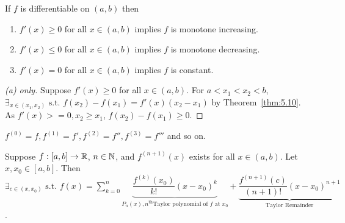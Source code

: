 \begin{thm}[11]
	If $f$ is differentiable on $(a,b)$ then
	\begin{enumerate}
		\item  $f'(x)\ge 0$ for all $x \in (a,b)$ implies $f$ is monotone increasing.
		\item  $f'(x)\le 0$ for all $x \in (a,b)$ implies $f$ is monotone decreasing.
		\item  $f'(x)= 0$ for all $x \in (a,b)$ implies $f$ is constant.
	\end{enumerate}
	\begin{proof}[(a) only]
		Suppose $f'(x)\ge 0$ for all $x \in (a,b)$.
		For $a<x_1<x_2<b$, $\exists_{x \in (x_1,x_2)} \text{ s.t. } f(x_2)-f(x_1)=f'(x)(x_2-x_1)$ by Theorem~\ref{thm:5.10}.
		As $f'(x)>=0, x_2\ge x_1$, $f(x_2)-f(x_1)\ge 0$.
	\end{proof}
\end{thm}

\begin{definition}
	$f^{(0)}=f, f^{(1)}=f', f^{(2)}=f'', f^{(3)}=f'''$ and so on.
\end{definition}

\begin{thm}
	Suppose $f:[a,b]\to \mathbb{R}$, $n \in \mathbb{N}$, and $f^{(n+1)}(x)$ exists for all $x \in (a,b)$.
	Let $x, x_0 \in [a,b]$. Then $\exists_{c \in (x, x_0)} \text{ s.t. } f(x)=\sum_{k=0}^{n}{\underbrace{\dfrac{f^{(k)}(x_0)}{k!} (x-x_0)^{k}}_{P_n(x),\text{$n^{\text{th}}$Taylor polynomial of $f$ at $x_0$}}+\underbrace{\dfrac{f^{(n+1)}(c)}{(n+1)!}(x-x_0)^{n+1}}_{\text{Taylor Remainder}}}$.
\end{thm}
